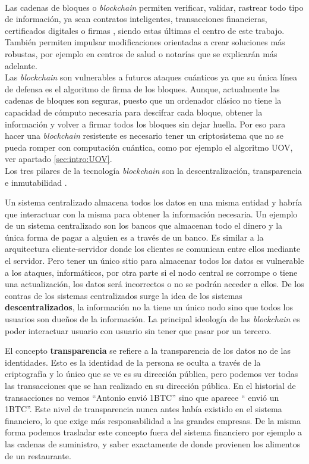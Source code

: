 \\





Las cadenas de bloques o \textit{blockchain} permiten verificar, validar, rastrear todo tipo de información, ya sean contratos inteligentes, transacciones financieras, certificados digitales o firmas \cite{blockchain}, siendo estas últimas el centro de este trabajo. También permiten impulsar modificaciones orientadas a crear soluciones más robustas, por ejemplo en centros de salud o notarías que se explicarán más adelante.\\

Las \textit{blockchain} son vulnerables a futuros ataques cuánticos ya que su única línea de defensa es el algoritmo de firma de los bloques. Aunque, actualmente las cadenas de bloques son seguras, puesto que un ordenador clásico no tiene la capacidad de cómputo necesaria para descifrar cada bloque, obtener la información y volver a firmar todos los bloques sin dejar huella. Por eso para hacer una \textit{blockchain} resistente es necesario tener un criptosistema que no se pueda romper con computación cuántica, como por ejemplo el algoritmo UOV, ver apartado \ref{sec:intro:UOV}. \\

Los tres pilares de la tecnología \textit{blockchain} son la descentralización, transparencia e inmutabilidad \cite{pilares-blockchain}.

Un sistema centralizado almacena todos los datos en una misma entidad y habría que interactuar con la misma para obtener la información necesaria. Un ejemplo de un sistema centralizado son los bancos que almacenan todo el dinero y la única forma de pagar a alguien es a través de un banco. Es similar a la arquitectura cliente-servidor donde los clientes se comunican entre ellos mediante el servidor. Pero tener un único sitio para almacenar todos los datos es vulnerable a los ataques, informáticos, por otra parte si el nodo central se corrompe o tiene una actualización, los datos será incorrectos o no se podrán acceder a ellos. De los contras de los sistemas centralizados surge la idea de los sistemas \textbf{descentralizados}, la información no la tiene un único nodo sino que todos los usuarios son dueños de la información. La principal ideología de las \textit{blockchain} es poder interactuar usuario con usuario sin tener que pasar por un tercero.

El concepto \textbf{transparencia} se refiere a la transparencia de los datos no de las identidades. Esto es la identidad de la persona se oculta a través de la criptografía y lo único que se ve es su dirección pública, pero podemos ver todas las transacciones que se han realizado en su dirección pública. En el historial de transacciones no vemos ``Antonio envió 1BTC'' sino que aparece `` envió un 1BTC''. Este nivel de transparencia nunca antes había existido en el sistema financiero, lo que exige más responsabilidad a las grandes empresas. De la misma forma podemos trasladar este concepto fuera del sistema financiero por ejemplo a las cadenas de suministro, y saber exactamente de donde provienen los alimentos de un restaurante.

